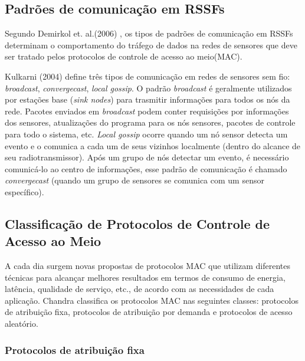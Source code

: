 \subsection{Padrões de comunicação em RSSFs}
\label{sec:comnPatt}
 
Segundo Demirkol et. al.(2006) \cite{Demirkol2006}, os tipos de padrões de comunicação em RSSFs determinam o comportamento do tráfego de dados na redes de sensores que deve ser tratado pelos protocolos de controle de acesso ao meio(MAC). 

Kulkarni (2004)\cite{Kulkarni2004} define três tipos de comunicação em redes de sensores sem fio: \textit{broadcast}, \textit{convergecast}, \textit{local gossip}. O padrão \textit{broadcast} é geralmente utilizados por estações base (\textit{sink nodes}) para trasmitir informações para todos os nós da rede. Pacotes enviados em \textit{broadcast} podem conter requisições por informações dos sensores, atualizações do programa para os nós sensores, pacotes de controle para todo o sistema, etc. \textit{Local gossip} ocorre quando um nó sensor detecta um evento e o comunica a cada um de seus vizinhos localmente (dentro do alcance de seu radiotransmissor). Após um grupo de nós detectar um evento, é necessário comunicá-lo ao centro de informações, esse padrão de comunicação é chamado \textit{convergecast} (quando um grupo de sensores se comunica com um sensor específico).

\subsection{Classificação de Protocolos de Controle de Acesso ao Meio}

A cada dia surgem novas propostas de protocolos MAC que utilizam diferentes técnicas para alcançar melhores resultados em termos de consumo de energia, latência, qualidade de serviço, etc., de acordo com as necessidades de cada aplicação. Chandra \cite{Chandra_2wireless} classifica os protocolos MAC nas seguintes classes: protocolos de atribuição fixa, protocolos de atribuição por demanda e protocolos de acesso aleatório.

 \subsubsection{Protocolos de atribuição fixa} 
 
